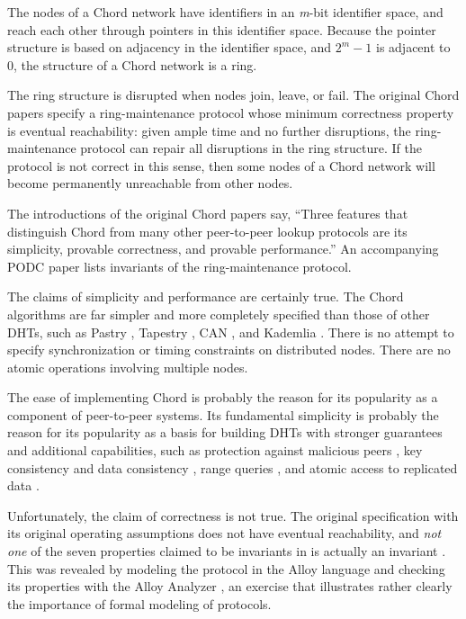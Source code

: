 \documentclass[conference]{IEEEtran}
\begin{document}
The nodes of a Chord network have identifiers in an {\it m}-bit
identifier space, and
reach each other through pointers in this identifier space.
Because the pointer structure is based on adjacency in the identifier
space, and $2^{m} - 1$ is adjacent to 0, the structure of a
Chord network is a ring.

The ring structure is disrupted when nodes join, leave, or fail.
The original Chord papers \cite{chord-sigcomm,chord-ton}
specify a ring-maintenance protocol whose 
minimum correctness property is eventual
reachability:  given ample time and no further disruptions, 
the ring-maintenance protocol can repair all disruptions in the ring
structure.
If the protocol is not correct in this sense, then some nodes of a
Chord network will become permanently unreachable from other nodes.

The introductions of the original Chord papers
say, ``Three features that
distinguish Chord from many other peer-to-peer lookup protocols
are its simplicity, provable correctness, and provable performance.''
An accompanying PODC paper \cite{chord-podc}
lists invariants of the ring-maintenance protocol.

The claims of simplicity and performance are certainly true.
The Chord algorithms are far simpler and more completely specified
than those of other DHTs, such as Pastry \cite{pastry},
Tapestry \cite{tapestry}, CAN \cite{CAN}, and Kademlia \cite{kademlia}.
There is no attempt to specify synchronization or timing constraints
on distributed nodes.
There are no atomic operations involving multiple nodes.

The ease of implementing Chord is probably the reason for its
popularity as a component of peer-to-peer systems.
Its fundamental simplicity is probably the reason for its
popularity as a
basis for building DHTs with stronger guarantees and additional
capabilities, such as
protection against malicious peers
\cite{awerbuch-robust,chord-byz,sechord},
key consistency and data consistency \cite{scatter},
range queries \cite{rangequeries},
and atomic access to replicated data \cite{atomicchord,etna}.

Unfortunately, the claim of correctness is not true.
The original specification with its original operating
assumptions does not have eventual reachability,
and {\it not one} of the seven properties claimed to be invariants
in \cite{chord-podc} is actually an invariant
\cite{chord-ccr}.
This was revealed by modeling the protocol in the Alloy language
and checking its properties with the Alloy Analyzer \cite{alloy-book},
an exercise that illustrates rather clearly the importance of formal
modeling of protocols.
\end{document}
